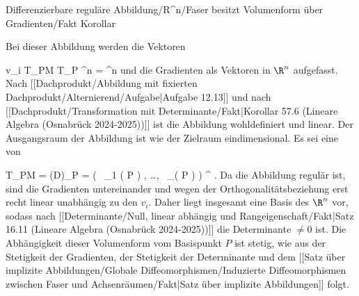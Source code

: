 {Differenzierbare reguläre Abbildung/R^n/Faser besitzt Volumenform über Gradienten/Fakt}
{Korollar}
{}
{

\faktzusatz {}
\faktzusatz {}

}
{

Bei dieser Abbildung werden die Vektoren

\mavergleichskette
{\vergleichskette
{ v_i
}
{ \in }{ T_PM
}
{ \subseteq }{ T_P \R^n
}
{ =   }{ \R^n
}
{   }{
}
}
{}{}{}
und die Gradienten als Vektoren in $\R^n$ aufgefasst. Nach
[[Dachprodukt/Abbildung mit fixierten Dachprodukt/Alternierend/Aufgabe|Aufgabe 12.13]]
und nach
[[Dachprodukt/Transformation mit Determinante/Fakt|Korollar 57.6 (Lineare Algebra (Osnabrück 2024-2025))]]
ist die Abbildung wohldefiniert und linear. Der Ausgangsraum der Abbildung ist wie der Zielraum eindimensional. Es sei
 eine
von

\mavergleichskettedisp
{\vergleichskette
{ T_PM
}
{ =} {   \left(D\varphi\right)_{P}
}
{ =} { (
 \, \varphi_1  (  P ) , \ldots ,
 \, \varphi_\ell ( P ) ) ^{ { \perp  } }
}
{ } {
}
{ } {
}
}
{}{}{.}
Da die Abbildung regulär ist, sind die Gradienten untereinander
und wegen der Orthogonalitätsbeziehung erst recht linear unabhängig zu den $v_i$. Daher liegt insgesamt eine Basis des $\R^n$ vor, sodass nach
[[Determinante/Null, linear abhängig und Rangeigenschaft/Fakt|Satz 16.11 (Lineare Algebra (Osnabrück 2024-2025))]]
die Determinante $\neq 0$ ist. Die Abhängigkeit dieser Volumenform vom Basispunkt $P$ ist stetig, wie aus der Stetigkeit der Gradienten, der Stetigkeit der Determinante und dem
[[Satz über implizite Abbildungen/Globale Diffeomorphismen/Induzierte Diffeomorphismen zwischen Faser und Achsenräumen/Fakt|Satz über implizite Abbildungen]]
folgt.

}

